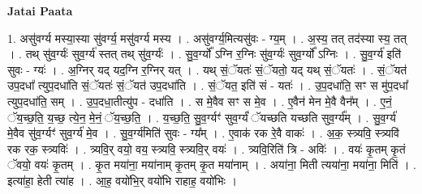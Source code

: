 \documentclass[17pt]{extarticle}
\begin{document}
\textbf{Jatai Paata} \newline

1. असु॑वर्ग्य मस्या॒स्या सु॑वर्ग्य॒ मसु॑वर्ग्य मस्य । . असु॑वर्ग्य॒मित्यसु॑वः - ग्य॒म् । . अ॒स्य॒ तत् तद॑स्या स्य॒ तत् । . तथ् सु॑व॒र्ग्यः॑ सुव॒र्ग्य॑ स्तत् तथ् सु॑व॒र्ग्यः॑ । . सु॒व॒र्ग्यो᳚ ऽग्नि र॒ग्निः सु॑व॒र्ग्यः॑ सुव॒र्ग्यो᳚ ऽग्निः । . सु॒व॒र्ग्य॑ इति॑ सुवः - ग्यः॑ । . अ॒ग्निर् यद् यद॒ग्नि र॒ग्निर् यत् । . यथ् सं॒ॅयतः॑ सं॒ॅयतो॒ यद् यथ् सं॒ॅयतः॑ । . सं॒ॅयत॑ उप॒दधा᳚ त्युप॒दधा॑ति सं॒ॅयतः॑ सं॒ॅयत॑ उप॒दधा॑ति । . सं॒ॅयत॒ इति॑ सं - यतः॑ । . उ॒प॒दधा॑ति॒ सꣳ स मु॑प॒दधा᳚ त्युप॒दधा॑ति॒ सम् । . उ॒प॒दधा॒तीत्यु॑प - दधा॑ति । . स मे॒वैव सꣳ स मे॒व । . ए॒वैन॑ मेन मे॒वै वैन᳚म् । . ए॒नं॒ ॅय॒च्छ॒ति॒ य॒च्छ॒ त्ये॒न॒ मे॒नं॒ ॅय॒च्छ॒ति॒ । . य॒च्छ॒ति॒ सु॒व॒र्ग्यꣳ॑ सुव॒र्ग्यं॑ ॅयच्छति यच्छति सुव॒र्ग्य᳚म् । . सु॒व॒र्ग्य॑ मे॒वैव सु॑व॒र्ग्यꣳ॑ सुव॒र्ग्य॑ मे॒व । . सु॒व॒र्ग्य॑मिति॑ सुवः - ग्य᳚म् । . ए॒वाक॑ रक रे॒वै वाकः॑ । . अ॒क॒ स्त्र्यवि॒ स्त्र्यवि॑ रक रक॒ स्त्र्यविः॑ । . त्र्यवि॒र् वयो॒ वय॒ स्त्र्यवि॒ स्त्र्यवि॒र् वयः॑ । . त्र्यवि॒रिति॑ त्रि - अविः॑ । . वयः॑ कृ॒तम् कृ॒तं ॅवयो॒ वयः॑ कृ॒तम् । . कृ॒त मया॑ना॒ मया॑नाम् कृ॒तम् कृ॒त मया॑नाम् । . अया॑ना॒ मिती त्यया॑ना॒ मया॑ना॒ मिति॑ । . इत्या॑हा॒ हेती त्या॑ह । . आ॒ह॒ वयो॑भि॒र् वयो॑भि राहाह॒ वयो॑भिः । \newline
\end{document}
